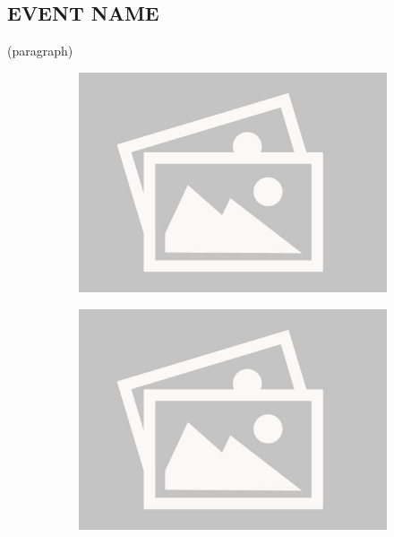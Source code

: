 \documentclass[a4paper,12pt]{report}
\begin{document}
\subsection{EVENT NAME} 
(paragraph)
\begin{figure}[H]
    \centering
    \begin{subfigure}{0.32\linewidth}
        \includegraphics[width=0.99\linewidth]{./photos/placeholder.jpg}
    \end{subfigure}
    \begin{subfigure}{0.32\linewidth}
        \includegraphics[width=0.99\linewidth]{./photos/placeholder.jpg}
    \end{subfigure}
    \begin{subfigure}{0.32\linewidth}

\end{subfigure}
\end{figure}
\end{document}
